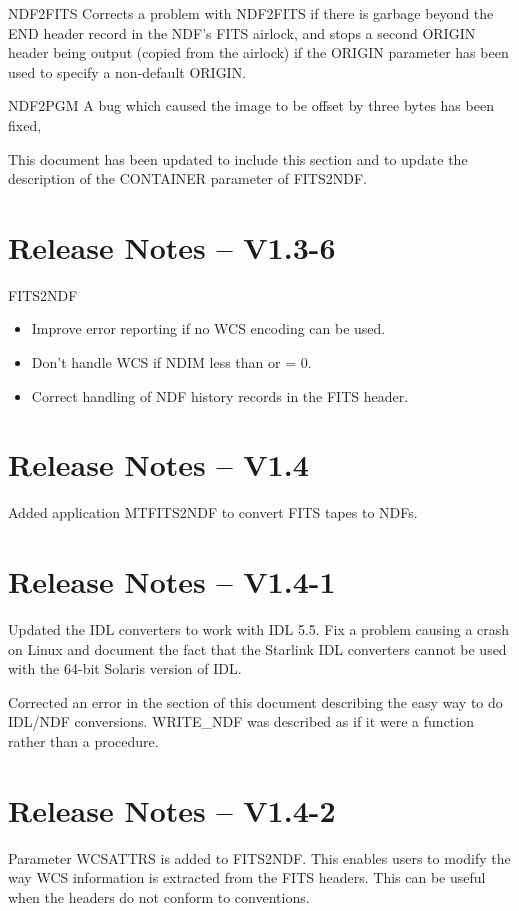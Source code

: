 \documentclass[twoside,11pt]{article}
\newcommand{\htmlref}[2]{#1}
\begin{document}
\htmlref{NDF2FITS}{NDF2FITS}
Corrects a problem with NDF2FITS if there is garbage beyond the END header
record in the NDF's FITS airlock, and stops a second ORIGIN header being
output (copied from the airlock) if the ORIGIN parameter has been used to
specify a non-default ORIGIN.

\htmlref{NDF2PGM}{NDF2PGM}
A bug which caused the image to be offset by three bytes has been fixed,

This document has been updated to include this section and to update the
description of the CONTAINER parameter of
\htmlref{FITS2NDF}{FITS2NDF}.

\section{Release Notes -- V1.3-6}
\htmlref{FITS2NDF}{FITS2NDF}
\begin{itemize}
\item Improve error reporting if no WCS encoding can be used.

\item Don't handle WCS if NDIM less than or = 0.

\item Correct handling of NDF history records in the FITS header.
\end{itemize}

\section{Release Notes -- V1.4}
Added application \htmlref{MTFITS2NDF}{MTFITS2NDF} to convert FITS tapes to NDFs.

\section{Release Notes -- V1.4-1}
Updated the IDL converters to work with IDL 5.5. Fix a problem causing a crash
on Linux and document the fact that the Starlink IDL converters cannot be used
with the 64-bit Solaris version of IDL.

Corrected an error in the section of this document describing the easy
way to do IDL/NDF conversions.  \htmlref{WRITE\_NDF}{WRITE_NDF} was
described as if it were a function rather than a procedure.

\section{Release Notes -- V1.4-2}
Parameter WCSATTRS is added to \htmlref{FITS2NDF}{FITS2NDF}.
This enables users to modify the way WCS information is extracted from the
FITS headers. This can be useful when the headers do not conform to conventions. 
\end{document}
